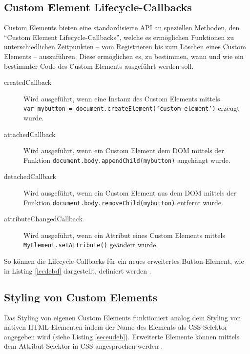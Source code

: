 


\subsection{Custom Element Lifecycle-Callbacks}\label{custom-element-lifecycle-callbacks}

Custom Elements bieten eine standardisierte \ac{API} an speziellen Methoden, den ``Custom Element Lifecycle-Callbacks'', welche es ermöglichen Funktionen zu unterschiedlichen Zeitpunkten -- vom Registrieren bis zum Löschen eines Custom Elements -- auszuführen. Diese ermöglichen es, zu bestimmen, wann und wie ein bestimmter Code des Custom Elements ausgeführt werden soll.

\begin{description}
  \item[createdCallback] Wird ausgeführt, wenn eine Instanz des Custom Elements mittels \texttt{var\ mybutton\ =\ document.createElement('custom-element')} erzeugt wurde.
  \item[attachedCallback] Wird ausgeführt, wenn ein Custom Element dem \ac{DOM} mittels der Funktion \texttt{document.body.appendChild(mybutton)} angehängt wurde.
  \item[detachedCallback] Wird ausgeführt, wenn ein Custom Element aus dem \ac{DOM} mittels der Funktion \texttt{document.body.removeChild(mybutton)} entfernt wurde.
  \item[attributeChangedCallback] Wird ausgeführt, wenn ein Attribut eines Custom Elements mittels \texttt{MyElement.setAttribute()} geändert wurde.
\end{description}

So können die Lifecycle-Callbacks für ein neues erweitertes Button-Element, wie in Listing \ref{lccdebd} dargestellt, definiert werden \cite{citeulike:13844988}.




\subsection{Styling von Custom Elements}\label{styling-von-custom-elements}

Das Styling von eigenen Custom Elements funktioniert analog dem Styling von nativen \ac{HTML}-Elementen indem der Name des Elements als \ac{CSS}-Selektor angegeben wird (siehe Listing \ref{seceudeb}). Erweiterte Elemente können mittels dem Attribut-Selektor in \ac{CSS} angesprochen werden \cite[S. 127--138]{citeulike:13844975}.



